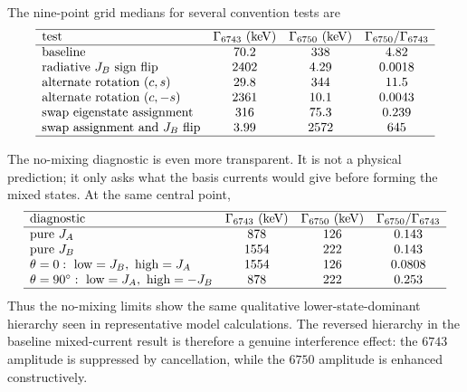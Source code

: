 \documentclass[11pt]{article}
\begin{document}
The nine-point grid medians for several convention tests are
\[
\begin{array}{lccc}
\hline
\text{test} & \Gamma_{6743}~({\rm keV}) & \Gamma_{6750}~({\rm keV})
& \Gamma_{6750}/\Gamma_{6743}\\
\hline
\text{baseline} & 70.2 & 338 & 4.82\\
\text{radiative }J_B\text{ sign flip} & 2402 & 4.29 & 0.0018\\
\text{alternate rotation }(c,s) & 29.8 & 344 & 11.5\\
\text{alternate rotation }(c,-s) & 2361 & 10.1 & 0.0043\\
\text{swap eigenstate assignment} & 316 & 75.3 & 0.239\\
\text{swap assignment and }J_B\text{ flip} & 3.99 & 2572 & 645\\
\hline
\end{array}
\]

The no-mixing diagnostic is even more transparent.  It is not a physical
prediction; it only asks what the basis currents would give before forming the
mixed states.  At the same central point,
\[
\begin{array}{lccc}
\hline
\text{diagnostic} & \Gamma_{6743}~({\rm keV}) & \Gamma_{6750}~({\rm keV})
& \Gamma_{6750}/\Gamma_{6743}\\
\hline
\text{pure }J_A & 878 & 126 & 0.143\\
\text{pure }J_B & 1554 & 222 & 0.143\\
\theta=0:\ {\rm low}=J_B,\ {\rm high}=J_A & 1554 & 126 & 0.0808\\
\theta=90^\circ:\ {\rm low}=J_A,\ {\rm high}=-J_B & 878 & 222 & 0.253\\
\hline
\end{array}
\]
Thus the no-mixing limits show the same qualitative lower-state-dominant
hierarchy seen in representative model calculations.  The reversed hierarchy
in the baseline mixed-current result is therefore a genuine interference
effect: the \(6743\) amplitude is suppressed by cancellation, while the
\(6750\) amplitude is enhanced constructively.
\end{document}
